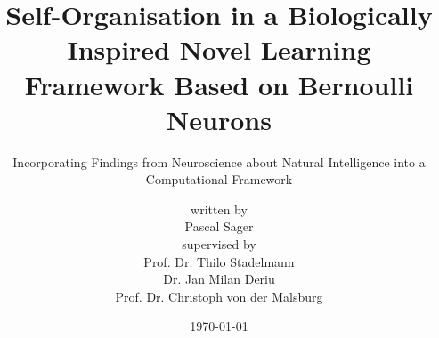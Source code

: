 \titlehead{Master of Science in Engineering with Specialisation in Data Science}

\subject{Master Thesis}
\title[Self-Organisation in a Biologically Inspired Novel Learning Framework Based on Bernoulli Neurons]{Self-Organisation in a Biologically Inspired Novel Learning Framework Based on Bernoulli Neurons}
\subtitle{Incorporating Findings from Neuroscience about Natural Intelligence into a Computational Framework}

\author[Pascal Sager]{{\small written by}\\Pascal Sager\\[1ex]  {\small supervised by}\\{\large Prof. Dr. Thilo Stadelmann}\\{\large Dr. Jan Milan Deriu}\\{\large Prof. Dr. Christoph von der Malsburg}\\[4ex]}

\date{\today}

\publishers{Zurich University of Applied Sciences\\Centre for Artificial Intelligence}